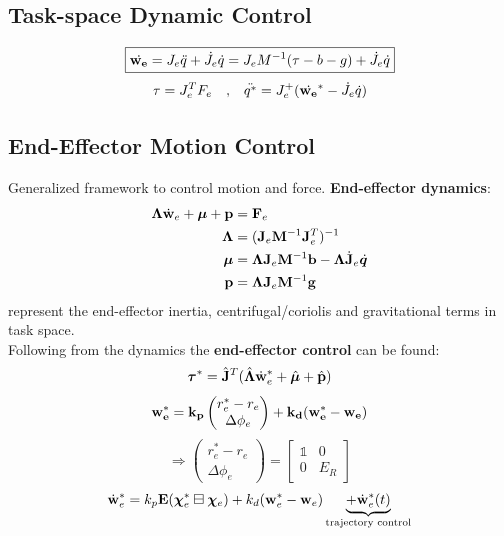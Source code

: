 \documentclass[a4paper, 8pt]{extarticle}
\begin{document}
\begin{multicols*}{3}
\newpage
\subsection{Task-space Dynamic Control}
$$\boxed{\dot{\bf w_{e}}
 =J_{e} \ddot{q} + \dot{J_{e}} \dot{q}=J_{e}M^{-1}(\tau - b -g)+\dot{J_{e}} \dot{q}}$$
 $$ \tau = J_{e}^{T}F_{e} \quad \textrm{,} \quad \ddot{q^*} = J_{e}^+ (\dot{\bf w_{e}}^* - \dot{J_{e}} \dot{{q}})$$ 
\subsection*{End-Effector Motion Control}
Generalized framework to control motion and force. \textbf{End-effector dynamics}:
\begin{align*}
\bm\Lambda \dot{\bf w}_e + \bm\mu + {\bf p} &= {\bf F}_e  \\
\bm\Lambda &= ({\bf J}_e{\bf M}^{-1}{\bf J}_e^T)^{-1} \\
\bm\mu     &= {\bm\Lambda}{\bf J}_e{\bf M}^{-1}{\bf b} - {\bm\Lambda}\dot{\bf J}_e\dot{\bm q} \\
{\bf p}    &= {\bm\Lambda}{\bf J}_e{\bf M}^{-1}{\bf g} \\
\end{align*}
represent the end-effector inertia, centrifugal/coriolis and gravitational terms in task space.\\
Following from the dynamics the \textbf{end-effector control} can be found:
$$\bm\tau^* = \hat{\bf J}^T(\hat{\bm\Lambda} \dot{\bf w}_e^* + \hat{\bm\mu} + \hat{\bf p})$$
$$\bf w_{e}^* =k_{p}\begin{pmatrix} r_{e}^* -r_{e}\\ \Delta \phi_{e}\end{pmatrix}+k_{d}(w_{e}^* - w_{e})$$
$$ \Rightarrow \begin{pmatrix} r_{e}^* -r_{e}\\ \Delta \phi_{e}\end{pmatrix} =\begin{bmatrix}
\mathbb{1} & 0 \\ 0 & E_{R} \end{bmatrix}$$
$$\dot{\bf w}_e^* = k_p{\bf E}(\bm\chi^*_e \boxminus \bm\chi_e) + k_d({\bf w}_e^* - {\bf w}_e) \underbrace{+ \dot{\bf w}_e^*(t)}_\text{trajectory control} $$


\end{multicols*}
\end{document}
